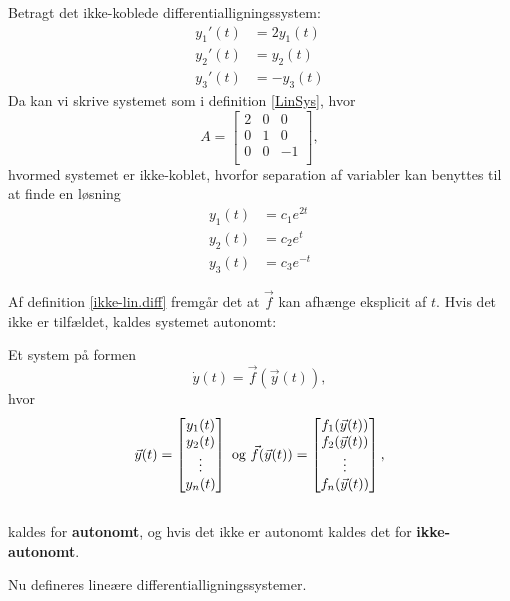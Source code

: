 \begin{Example}
\textnormal{ \hfill \break
Betragt det ikke-koblede differentialligningssystem:}
\hfill \break
\begin{align*}
    y_1'(t) &= 2y_1(t)\\
    y_2'(t) &= y_2(t)\\
    y_3'(t) &= -y_3(t)
\end{align*}
\textnormal{Da kan vi skrive systemet som i definition \ref{LinSys}, hvor}
\hfill \break
\[ A =
\begin{bmatrix}
2 & 0 & 0\\
0 & 1 & 0\\
0 & 0 & -1\\
\end{bmatrix},
\]
\textnormal{hvormed systemet er ikke-koblet, hvorfor separation af variabler kan benyttes til at finde en løsning}
\begin{align*}
    y_1(t) &= c_1e^{2t}\\
    y_2(t) &= c_2e^t\\
    y_3(t) &= c_3e^{-t}
\end{align*}

\end{Example}

Af definition \ref{ikke-lin.diff} fremgår det at $\vec{f}$ kan afhænge eksplicit af $t$. Hvis det ikke er tilfældet, kaldes systemet autonomt:
\begin{definition}[Autonomitet]\label{autonom}
Et system på formen
$$\dot{y}(t)=\vec{f}(\vec{y}(t)),$$
hvor $$\vec{y}(t)=
\begin{bmatrix}
y_1(t) \\
y_2(t) \\
\vdots \\
y_n(t)
\end{bmatrix} \ \textnormal{og} \ \vec{f}(\vec{y}(t))=\begin{bmatrix}
f_1(\vec{y}(t)) \\
f_2(\vec{y}(t)) \\
\vdots \\
f_n(\vec{y}(t))
\end{bmatrix},$$ \\
kaldes for \textbf{autonomt}, og hvis det ikke er autonomt kaldes det for \textbf{ikke-autonomt}.
\end{definition}

Nu defineres lineære differentialligningssystemer.

